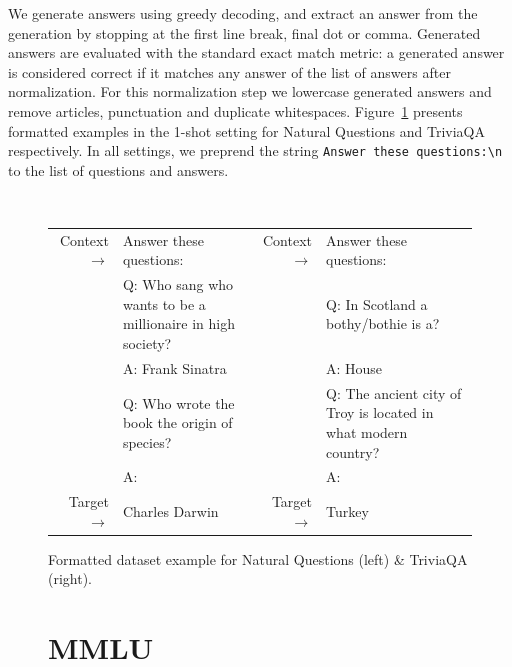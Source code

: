 \documentclass[11pt]{article}
\begin{document}
We generate answers using greedy decoding, and extract an answer from the generation by stopping at the first line break, final dot or comma.
Generated answers are evaluated with the standard exact match metric:
a generated answer is considered correct if it matches any answer of the list of answers after normalization.
For this normalization step we lowercase generated answers and remove articles, punctuation and duplicate whitespaces.
Figure~\ref{fig:qa} presents formatted examples in the 1-shot setting for Natural Questions and TriviaQA respectively.
In all settings, we preprend the string {\tt Answer these questions:\textbackslash n} to the list of questions and answers.

\begin{figure}[h]
{ \tt \tiny
\begin{tabularx}{\linewidth}{r@{\ }X|r@{\ }X} 
\toprule 
Context $\to$ &Answer these questions: & Context $\to$ &Answer these questions: \\
&Q: Who sang who wants to be a millionaire in high society? &&Q: In Scotland a bothy/bothie is a?\\
&A: Frank Sinatra & & A: House\\
&Q: Who wrote the book the origin of species?&&Q: The ancient city of Troy is located in what modern country? \\
&A: && A:\\
\midrule 
Target  $\to$ &Charles Darwin & Target $\to$ & Turkey\\
\bottomrule 
\end{tabularx}}
\caption{Formatted dataset example for Natural Questions (left) \& TriviaQA (right).}  
\label{fig:qa}  
\end{figure}

\clearpage
\begin{figure}
\section{MMLU}
\end{figure}
\end{document}
